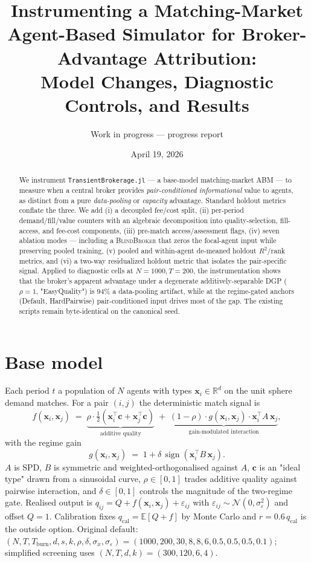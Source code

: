 \documentclass[11pt,a4paper]{article}
\title{Instrumenting a Matching-Market Agent-Based Simulator for Broker-Advantage Attribution:\\
  Model Changes, Diagnostic Controls, and Results}
\author{Work in progress --- progress report}
\date{April 19, 2026}
\newcommand{\xvec}{\mathbf{x}}
\newcommand{\cvec}{\mathbf{c}}
\newcommand{\Ebb}{\mathbb{E}}
\begin{document}
\maketitle

\begin{abstract}
We instrument \texttt{TransientBrokerage.jl} --- a base-model matching-market ABM --- to measure when a central broker provides \emph{pair-conditioned informational} value to agents, as distinct from a pure \emph{data-pooling} or \emph{capacity} advantage. Standard holdout metrics conflate the three. We add (i) a decoupled fee/cost split, (ii) per-period demand/fill/value counters with an algebraic decomposition into quality-selection, fill-access, and fee-cost components, (iii) pre-match access/assessment flags, (iv) seven ablation modes --- including a \textsc{BlindBroker} that zeros the focal-agent input while preserving pooled training, (v) pooled and within-agent de-meaned holdout $R^2$/rank metrics, and (vi) a two-way residualized holdout metric that isolates the pair-specific signal. Applied to diagnostic cells at $N{=}1000, T{=}200$, the instrumentation shows that the broker's apparent advantage under a degenerate additively-separable DGP ($\rho{=}1$, "EasyQuality") is 94\% a data-pooling artifact, while at the regime-gated anchors (Default, HardPairwise) pair-conditioned input drives most of the gap. The existing scripts remain byte-identical on the canonical seed.
\end{abstract}

\section{Base model}
\label{sec:model}
Each period $t$ a population of $N$ agents with types $\xvec_i \in \mathbb{R}^d$ on the unit sphere demand matches. For a pair $(i,j)$ the deterministic match signal is
\begin{equation}
\label{eq:match}
f(\xvec_i,\xvec_j) \;=\; \underbrace{\rho \cdot \tfrac{1}{2}\!\left(\xvec_i^\top \cvec + \xvec_j^\top \cvec\right)}_{\text{additive quality}}
\;+\; \underbrace{(1-\rho)\cdot g(\xvec_i,\xvec_j)\cdot \xvec_i^\top A\,\xvec_j}_{\text{gain-modulated interaction}},
\end{equation}
with the regime gain
\begin{equation}
\label{eq:gain}
g(\xvec_i,\xvec_j) \;=\; 1 + \delta\,\operatorname{sign}(\xvec_i^\top B\,\xvec_j).
\end{equation}
$A$ is SPD, $B$ is symmetric and weighted-orthogonalised against $A$, $\cvec$ is an "ideal type" drawn from a sinusoidal curve, $\rho \in [0,1]$ trades additive quality against pairwise interaction, and $\delta \in [0,1]$ controls the magnitude of the two-regime gate. Realised output is $q_{ij} = Q + f(\xvec_i,\xvec_j) + \varepsilon_{ij}$ with $\varepsilon_{ij} \sim \mathcal{N}(0,\sigma_\varepsilon^2)$ and offset $Q = 1$. Calibration fixes $q_{\mathrm{cal}} = \Ebb[Q + f]$ by Monte Carlo and $r = 0.6\,q_{\mathrm{cal}}$ is the outside option. Original default: $(N,T,T_{\mathrm{burn}},d,s,k,\rho,\delta,\sigma_x,\sigma_\varepsilon)=(1000,200,30,8,8,6,0.5,0.5,0.5,0.1)$; simplified screening uses $(N,T,d,k)=(300,120,6,4)$.
\end{document}
